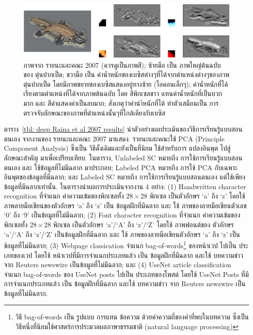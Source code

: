 %
\begin{figure}
\begin{center}
\includegraphics[width=5in]{04SelfTaught/RainaEtAlFig4.png}
\end{center}
\caption{ภาพจาก รายนะและคณะ 2007 (ควรดูเป็นภาพสี); ซ้ายมือ เป็น ภาพใหญ่ต้นฉบับ ของ ตุ่นปากเป็ด; ขวามือ เป็น ค่าน้ำหนักของเบซิสต่างๆที่ได้จากตำแหน่งต่างๆของภาพตุ่นปากเป็ด โดยมีภาพขยายของเบซิสแสดงอยู่ทางซ้าย (ไอคอนเล็กๆ); ค่าน้ำหนักที่ได้เรียงตามตำแหน่งที่ได้จากภาพต้นฉบับ โดย สีพิกเซลขาว แทนค่าน้ำหนักที่เป็นบวกมาก และ สีดำแสดงค่าเป็นลบมาก; สังเกตุว่าค่านำ้หนักที่ได้ ทำตัวเสมือนเป็น การตรวจจับลักษณะของภาพที่ตำแหน่งนั้นๆที่ใกล้เคียงกับเบซิส}
\label{fig: deep Raina et al Fig 4}
\end{figure}
%


ตาราง~\ref{tbl: deep Raina et al 2007 results} นำตัวอย่างผลประเมินของวิธีการเรียนรู้แบบสอนตนเอง จากงานของ รายนะและคณะ 2007\cite{RainaEtAl2007a} มาแสดง.
รายนะและคณะใช้ PCA (Principle Component Analysis) ซึ่งเป็น วิธีดั้งเดิมและยังเป็นที่นิยม ใช้สำหรับการ แปลงอินพุต ไปสู่ ลักษณะสำคัญ มาเพื่อเปรียบเทียบ.
ในตาราง, Unlabeled SC หมายถึง การใช้การเรียนรู้แบบสอนตนเอง และ ใช้ข้อมูลที่ไม่มีฉลาก มาประกอบ; Labeled PCA หมายถึง การใช้ PCA กับเฉพาะอินพุตของข้อมูลที่มีฉลาก;
และ Labeled SC หมายถึง การใช้การเรียนรู้แบบสอนตนเอง แต่ใช้เพียง ข้อมูลที่มีฉลากเท่านั้น.
ในตารางนำผลการประเมินจากงาน 4 อย่าง: (1) Handwritten character recognition ที่จำแนก ค่าความเข้มของพิกเซลทั้ง $28 \times 28$ พิกเซล เป็นตัวอักษร `a' ถึง `z' โดยใช้ ภาพลายมือเขียนของตัวอักษร `a' ถึง `z' เป็น ข้อมูลฝึกที่มีฉลาก และ ใช้ ภาพของลายมือเขียนตัวเลข `0' ถึง `9' เป็นข้อมูลที่ไม่มีฉลาก;
(2) Font character recognition ที่จำแนก ค่าความเข้มของพิกเซลทั้ง $28 \times 28$ พิกเซล เป็นตัวอักษร `a'/`A' ถึง `z'/`Z'
โดยใช้ ภาพฟอนต์ของ ตัวอักษร `a'/`A' ถึง `z'/`Z' เป็นข้อมูลฝึกที่มีฉลาก และ ใช้
ภาพของลายมือเขียนตัวอักษร `a' ถึง `z' เป็นข้อมูลที่ไม่มีฉลาก;
(3) Webpage classication จำแนก bag-of-words\footnote{วิธี bag-of-words เป็น รูปแบบ การแทน ข้อความ ด้วยค่าความถี่ของคำที่พบในบทความ ซึ่งเป็นวิธีหนึ่งที่นิยมใช้ศาสตร์การประมวลผลภาษาธรรมชาติ (natural language processing)} ของหน้าเวป ไปเป็น ประเภทของเวป
โดยใช้ หน้าเวปที่มีการจำแนกประเภทแล้ว เป็น ข้อมูลฝึกที่มีฉลาก
และใช้ บทความข่าว จาก Reuters newswire เป็นข้อมูลที่ไม่มีฉลาก;
และ (4) UseNet article classification จำแนก bag-of-words ของ UseNet posts ไปเป็น ประเภทของโพสต์
โดยใช้ UseNet Posts ที่มีการจำแนกประเภทแล้ว เป็น ข้อมูลฝึกที่มีฉลาก
และใช้ บทความข่าว จาก Reuters newswire เป็นข้อมูลที่ไม่มีฉลาก.

